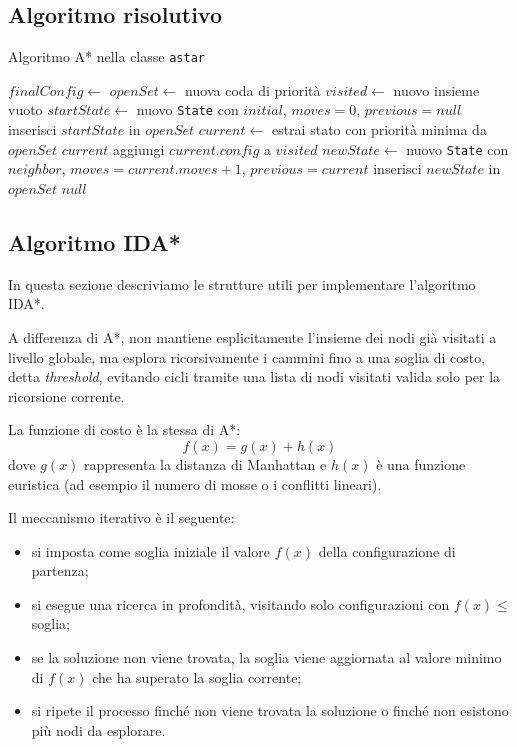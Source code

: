 \subsection{Algoritmo risolutivo}
\begin{algorithm}[H]
\caption{Algoritmo A* nella classe \texttt{astar}}
\small
\begin{algorithmic}[1]
    \State $finalConfig \gets$ 
    \State $openSet \gets$ nuova coda di priorità
    \State $visited \gets$ nuovo insieme vuoto
    \State $startState \gets$ nuovo \texttt{State} con $initial$, $moves=0$, $previous=null$
    \State inserisci $startState$ in $openSet$
        \State $current \gets$ estrai stato con priorità minima da $openSet$
            \State \Return $current$ 
        \EndIf
        \State aggiungi $current.config$ a $visited$
                \State $newState \gets$ nuovo \texttt{State} con $neighbor$, $moves = current.moves + 1$, $previous = current$
                \State inserisci $newState$ in $openSet$
            \EndIf
        \EndFor
    \EndWhile
    \State \Return $null$ 
\EndFunction
\end{algorithmic}
\end{algorithm}

\subsection{Algoritmo IDA*}
In questa sezione descriviamo le strutture utili per implementare l’algoritmo IDA*.
 
A differenza di A*, non mantiene esplicitamente l’insieme dei nodi già visitati a livello globale, ma esplora ricorsivamente i cammini fino a una soglia di costo, detta \emph{threshold}, evitando cicli tramite una lista di nodi visitati valida solo per la ricorsione corrente.  

La funzione di costo è la stessa di A*:  
\[
f(x) = g(x) + h(x)
\]  
dove $g(x)$ rappresenta la distanza di Manhattan e $h(x)$ è una funzione euristica (ad esempio il numero di mosse o i conflitti lineari).  

Il meccanismo iterativo è il seguente:  
\begin{itemize}
    \item si imposta come soglia iniziale il valore $f(x)$ della configurazione di partenza;
    \item si esegue una ricerca in profondità, visitando solo configurazioni con $f(x) \leq$ soglia;
    \item se la soluzione non viene trovata, la soglia viene aggiornata al valore minimo di $f(x)$ che ha superato la soglia corrente;
    \item si ripete il processo finché non viene trovata la soluzione o finché non esistono più nodi da esplorare.
\end{itemize}


